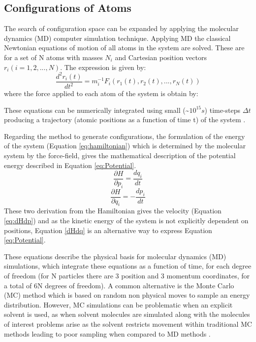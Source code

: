 \subsection{Configurations of Atoms}
The search of configuration space can be expanded by applying the molecular dynamics (MD) computer simulation technique. Applying MD the classical Newtonian equations of motion of all atoms in the system are solved. These are for a set of N atoms with masses $N_i$ and Cartesian position vectors $r_i (i=1,2,...,N)$. The expression is given by:
\begin{equation}
    \frac{d^{2}r_i(t)}{dt^2}=m_{i}^{-1} F_i(r_1(t),r_2(t),...,r_N(t))
    \label{eq:Newton}
\end{equation}
where the force applied to each atom of the system is obtain by:

These equations can be numerically integrated using small (\~$10^{15}s$) time-steps $\Delta t$ producing a trajectory (atomic positions as a function of time t) of the system \cite{van1988role}.

Regarding the method to generate configurations, the formulation of the energy of the system (Equation \ref{eq:hamiltonian}) which is determined by the molecular system by the force-field, gives the mathematical description of the potential energy described in Equation \ref{eq:Potential}. 
\begin{equation}
    \frac{\partial H}{\partial p_i}=\frac{dq_i}{dt}
    \label{eq:dHdp}
\end{equation}
\begin{equation}
    \frac{\partial H}{\partial q_i}=-\frac{dp_i}{dt}
    \label{dHdq}
\end{equation}
These two derivation from the Hamiltonian gives the velocity (Equation \ref{eq:dHdp}) and as the kinetic energy of the system is not explicitly dependent on positions, Equation \ref{dHdq} is an alternative way to express Equation \ref{eq:Potential}.

These equations describe the physical basis for molecular dynamics (MD) simulations, which integrate these equations as a function of time, for each degree of freedom (for N particles there are 3 position and 3 momentum coordinates, for a total of 6N degrees of freedom). A common alternative is the Monte Carlo (MC) method which is based on random non physical moves to sample an energy distribution. However, MC simulations can be problematic when an explicit solvent is used, as when solvent molecules are simulated along with the molecules of interest problems arise as the solvent restricts movement within traditional MC methods leading to poor sampling when compared to MD methods \cite{wang2008calculation}.


